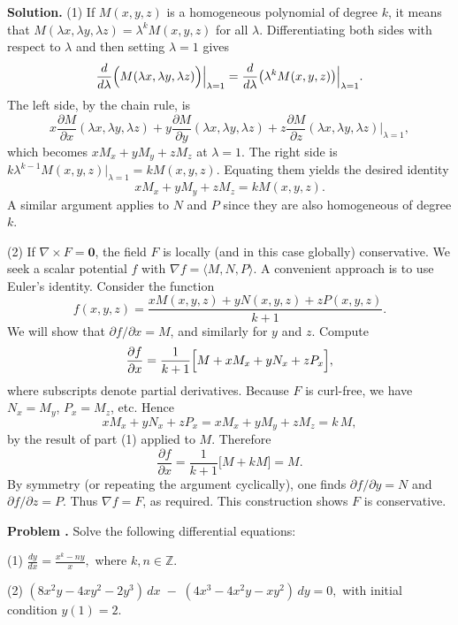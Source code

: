 \documentclass[12pt, a4paper, oneside]{article}
\newcounter{problemname}
\newenvironment{problem}
  {\begin{shaded}\stepcounter{problemname}\par\noindent\textbf{Problem \arabic{problemname}. }\newline}
  {\end{shaded}\par}
\newenvironment{solution}
  {\par\noindent\textbf{Solution. }\newline}
  {\par}
\begin{document}
\begin{solution}
(1) If \(M(x,y,z)\) is a homogeneous polynomial of degree \(k\), it means that \(M(\lambda x,\lambda y,\lambda z)=\lambda^k M(x,y,z)\) for all \(\lambda\). Differentiating both sides with respect to \(\lambda\) and then setting \(\lambda=1\) gives
\[
\frac{d}{d\lambda}\Bigl(M(\lambda x,\lambda y,\lambda z)\Bigr)\Big|_{\lambda=1}
= \frac{d}{d\lambda}\bigl(\lambda^k M(x,y,z)\bigr)\Big|_{\lambda=1}.
\]
The left side, by the chain rule, is 
\[
x\frac{\partial M}{\partial x}(\lambda x,\lambda y,\lambda z) + y\frac{\partial M}{\partial y}(\lambda x,\lambda y,\lambda z) + z\frac{\partial M}{\partial z}(\lambda x,\lambda y,\lambda z)\Big|_{\lambda=1},
\]
which becomes \(xM_x + yM_y + zM_z\) at \(\lambda=1\). The right side is \(k\lambda^{k-1}M(x,y,z)\big|_{\lambda=1} = kM(x,y,z)\). Equating them yields the desired identity
\[
xM_x + yM_y + zM_z = k M(x,y,z).
\]
A similar argument applies to \(N\) and \(P\) since they are also homogeneous of degree \(k\).

(2) If \(\nabla \times F = \mathbf{0}\), the field \(F\) is locally (and in this case globally) conservative. We seek a scalar potential \(f\) with \(\nabla f = \langle M,N,P\rangle\). A convenient approach is to use Euler's identity. Consider the function 
\[
f(x,y,z) = \frac{xM(x,y,z) + yN(x,y,z) + zP(x,y,z)}{k+1}.
\]
We will show that \(\partial f/\partial x = M\), and similarly for \(y\) and \(z\). Compute
\[
\frac{\partial f}{\partial x} = \frac{1}{k+1}\Bigl[ M + xM_x + yN_x + zP_x \Bigr],
\]
where subscripts denote partial derivatives. Because \(F\) is curl-free, we have \(N_x = M_y\), \(P_x = M_z\), etc. Hence
\[
xM_x + yN_x + zP_x = xM_x + yM_y + zM_z = k\,M,
\]
by the result of part (1) applied to \(M\). Therefore
\[
\frac{\partial f}{\partial x} = \frac{1}{k+1}\bigl[M + kM\bigr] = M.
\]
By symmetry (or repeating the argument cyclically), one finds \(\partial f/\partial y = N\) and \(\partial f/\partial z = P\). Thus \(\nabla f = F\), as required. This construction shows \(F\) is conservative. 
\end{solution}
\newpage
\begin{problem}
Solve the following differential equations:

(1) \(\displaystyle \frac{dy}{dx} = \frac{x^k - n y}{x},\) where \(k,n\in \mathbb{Z}\).

(2) \(\displaystyle (8x^2y - 4xy^2 - 2y^3)\,dx \;-\; (4x^3 - 4x^2y - x y^2)\,dy = 0,\) with initial condition \(y(1)=2\).
\end{problem}
\end{document}
